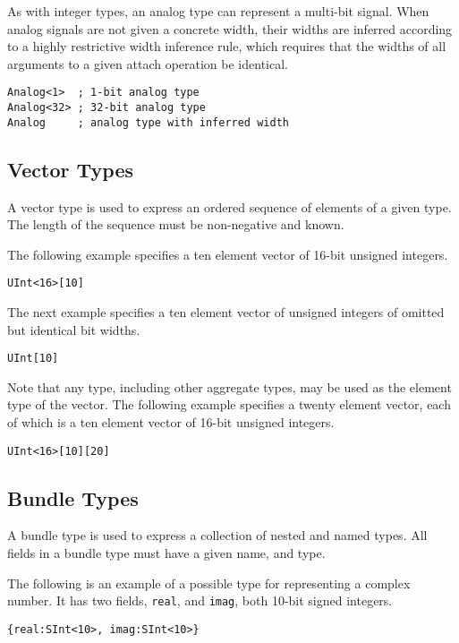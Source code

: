 \documentclass[12pt]{article}
\begin{document}
As with integer types, an analog type can represent a multi-bit signal. When analog signals are not
given a concrete width, their widths are inferred according to a highly restrictive width inference
rule, which requires that the widths of all arguments to a given attach operation be identical.

\begin{lstlisting}
Analog<1>  ; 1-bit analog type
Analog<32> ; 32-bit analog type
Analog     ; analog type with inferred width
\end{lstlisting}

\subsection{Vector Types}

A vector type is used to express an ordered sequence of elements of a given type. The length of the sequence must be non-negative and known.

The following example specifies a ten element vector of 16-bit unsigned integers.
\begin{lstlisting}
UInt<16>[10]
\end{lstlisting}

The next example specifies a ten element vector of unsigned integers of omitted but identical bit widths.
\begin{lstlisting}
UInt[10]
\end{lstlisting}

Note that any type, including other aggregate types, may be used as the element type of the vector. The following example specifies a twenty element vector, each of which is a ten element vector of 16-bit unsigned integers.
\begin{lstlisting}
UInt<16>[10][20]
\end{lstlisting}

\subsection{Bundle Types}

A bundle type is used to express a collection of nested and named types. All fields in a bundle type must have a given name, and type.

The following is an example of a possible type for representing a complex number. It has two fields, \verb|real|, and \verb|imag|, both 10-bit signed integers.
\begin{lstlisting}
{real:SInt<10>, imag:SInt<10>}
\end{lstlisting}
\end{document}
